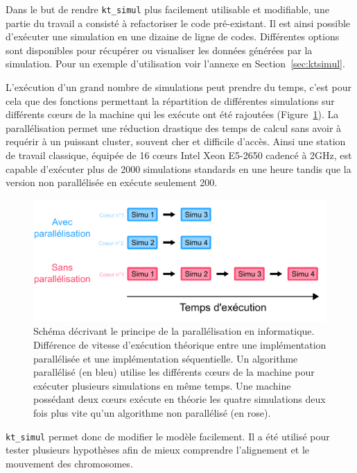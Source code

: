 \documentclass[12pt,a4paper,twoside,openright]{book}
\begin{document}
Dans le but de rendre \texttt{kt\_simul} plus facilement utilisable et
modifiable, une partie du travail a consisté à refactoriser le code
pré-existant. Il est ainsi possible d'exécuter une simulation en une
dizaine de ligne de codes. Différentes options sont disponibles pour
récupérer ou visualiser les données générées par la simulation. Pour un
exemple d'utilisation voir l'annexe en Section~\ref{sec:ktsimul}.

L'exécution d'un grand nombre de simulations peut prendre du temps,
c'est pour cela que des fonctions permettant la répartition de
différentes simulations sur différents cœurs de la machine qui les
exécute ont été rajoutées (Figure~\ref{fig:parallel}). La
parallélisation permet une réduction drastique des temps de calcul sans
avoir à requérir à un puissant cluster, souvent cher et difficile
d'accès. Ainsi une station de travail classique, équipée de 16 cœurs
Intel Xeon E5-2650 cadencé à 2GHz, est capable d'exécuter plus de 2000
simulations standards en une heure tandis que la version non
parallélisée en exécute seulement 200.

\begin{figure}[htbp]
\centering
\includegraphics{figures/results/modelling/parallel.png}
\caption[Schéma décrivant le principe de la parallélisation en informatique]{\label{fig:parallel}Schéma
décrivant le principe de la parallélisation en informatique. Différence
de vitesse d'exécution théorique entre une implémentation parallélisée
et une implémentation séquentielle. Un algorithme parallélisé (en bleu)
utilise les différents cœurs de la machine pour exécuter plusieurs
simulations en même temps. Une machine possédant deux cœurs exécute en
théorie les quatre simulations deux fois plus vite qu'un algorithme non
parallélisé (en rose).}
\end{figure}

\texttt{kt\_simul} permet donc de modifier le modèle facilement. Il a
été utilisé pour tester plusieurs hypothèses afin de mieux comprendre
l'alignement et le mouvement des chromosomes.
\end{document}
